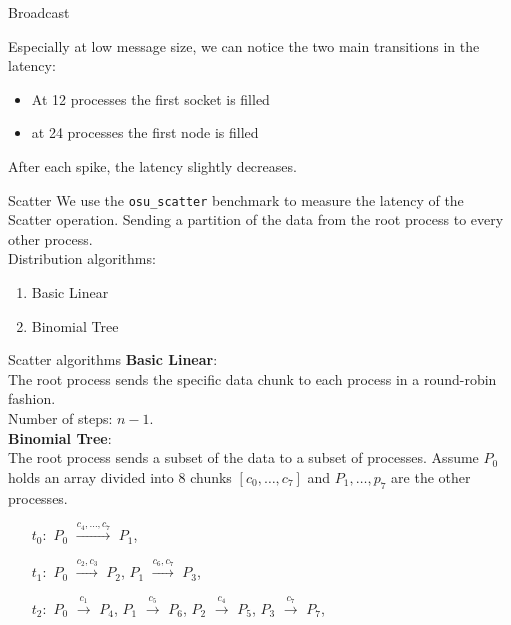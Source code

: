 \begin{frame}[fragile]{Broadcast}
\begin{multicols}{2}
        \columnbreak

        Especially at low message size, we can notice the two main
        transitions in the latency:
        \begin{itemize}
            \item At 12 processes the first socket is filled
            \item at 24 processes the first node is filled
        \end{itemize}

        After each spike, the latency slightly decreases.
    \end{multicols}
\end{frame}

%
%
\begin{frame}[fragile]{Scatter}
    We use the \texttt{osu\_scatter} benchmark to measure the latency
    of the Scatter operation. Sending a partition of the data from the
    root process to every other process. \\
    Distribution algorithms:
    \begin{enumerate}
        \item Basic Linear
        \item Binomial Tree
    \end{enumerate}
\end{frame}
\begin{frame}[fragile]{Scatter algorithms}
    \textbf{Basic Linear}: \\
    The root process sends the specific data chunk to each process
    in a round-robin fashion. \\
    Number of steps: $n-1$. \\
    \vspace*{.25cm}
    \textbf{Binomial Tree}: \\
    The root process sends a subset of the data to a subset of processes.
    Assume $P_0$ holds an array divided
    into $8$ chunks $[ c_0, \dots, c_7 ]$ and $P_1, \dots, p_7$ are
    the other processes.
    \begin{enumerate}
        \item[$t_0:$] $P_0$ $\xrightarrow{c_4,\dots,c_7}$ $P_1$,
        \item[$t_1:$] $P_0$ $\xrightarrow{c_2,c_3}$ $P_2$, $P_1$ $\xrightarrow{c_6,c_7}$ $P_3$,
        \item[$t_2:$] $P_0$ $\xrightarrow{c_1}$ $P_4$, $P_1$ $\xrightarrow{c_5}$ $P_6$, $P_2$ $\xrightarrow{c_4}$ $P_5$, $P_3$ $\xrightarrow{c_7}$ $P_7$,
    \end{enumerate}
\end{frame}
